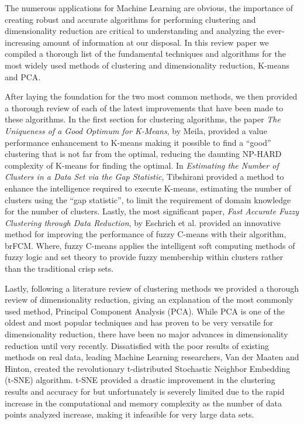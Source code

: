 \documentclass{article}
\begin{document}
The numerous applications for Machine Learning are obvious, the importance of creating robust and accurate algorithms for performing clustering and dimensionality reduction are critical to understanding and analyzing the ever-increasing amount of information at our disposal. In this review paper we compiled a thorough list of the fundamental techniques and algorithms for the most widely used methods of clustering and dimensionality reduction, K-means and PCA.

After laying the foundation for the two most common methods, we then provided a thorough review of each of the latest improvements that have been made to these algorithms. In the first section for clustering algorithms, the paper \emph{The Uniqueness of a Good Optimum for K-Means}, by Meila, provided a value performance enhancement to K-means making it possible to find a ``good'' clustering that is not far from the optimal, reducing the daunting NP-HARD complexity of K-means for finding the optimal\cite{meilua2006uniqueness}. In \emph{Estimating the Number of Clusters in a Data Set via the Gap Statistic}, Tibshirani provided a method to enhance the intelligence required to execute K-means, estimating the number of clusters using the ``gap statistic'', to limit the requirement of domain knowledge for the number of clusters\cite{tibshirani2001estimating}. Lastly, the most significant paper, \emph{Fast Accurate Fuzzy Clustering through Data Reduction}, by Eschrich et al. provided an innovative method for improving the performance of fuzzy C-means with their algorithm, brFCM. Where, fuzzy C-means applies  the intelligent soft computing methods of fuzzy logic and set theory to provide fuzzy membership within clusters rather than the traditional crisp sets\cite{eschrich2003fast}.

Lastly, following a literature review of clustering methods we provided a thorough review of dimensionality reduction, giving an explanation of the most commonly used method, Principal Component Analysis (PCA). While PCA is one of the oldest and most popular techniques and has proven to be very versatile for dimensionality reduction, there have been no major advances in dimensionality reduction until very recently. Dissatisfied with the poor results of existing methods on real data, leading Machine Learning researchers, Van der Maaten and Hinton, created the revolutionary t-distributed Stochastic Neighbor Embedding (t-SNE) algorithm. t-SNE provided a drastic improvement in the clustering results and accuracy for but unfortunately is severely limited due to the rapid increase in the computational and memory complexity as the number of data points analyzed increase, making it infeasible for very large data sets\cite{van2008visualizing}.
\end{document}
